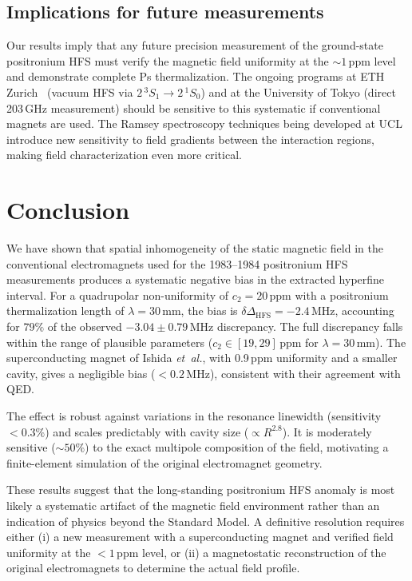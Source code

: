 \documentclass[twocolumn,pra,aps,superscriptaddress,floatfix,10pt]{revtex4-2}
\begin{document}
\subsection{Implications for future measurements}

Our results imply that any future precision measurement of the ground-state positronium HFS must verify the magnetic field uniformity at the $\sim 1$\,ppm level and demonstrate complete Ps thermalization. The ongoing programs at ETH Zurich~\cite{ThorpeWoods2026} (vacuum HFS via $2\,^3S_1 \to 2\,^1S_0$) and at the University of Tokyo (direct 203\,GHz measurement) should be sensitive to this systematic if conventional magnets are used. The Ramsey spectroscopy techniques being developed at UCL~\cite{Newson2026} introduce new sensitivity to field gradients between the interaction regions, making field characterization even more critical.

\section{Conclusion}
\label{sec:conclusion}

We have shown that spatial inhomogeneity of the static magnetic field in the conventional electromagnets used for the 1983--1984 positronium HFS measurements produces a systematic negative bias in the extracted hyperfine interval. For a quadrupolar non-uniformity of $c_2 = 20$\,ppm with a positronium thermalization length of $\lambda = 30$\,mm, the bias is $\delta\Delta_\mathrm{HFS} = -2.4$\,MHz, accounting for $79\%$ of the observed $-3.04 \pm 0.79$\,MHz discrepancy. The full discrepancy falls within the range of plausible parameters ($c_2 \in [19, 29]$\,ppm for $\lambda = 30$\,mm). The superconducting magnet of Ishida \textit{et~al.}, with 0.9\,ppm uniformity and a smaller cavity, gives a negligible bias ($< 0.2$\,MHz), consistent with their agreement with QED.

The effect is robust against variations in the resonance linewidth (sensitivity $< 0.3\%$) and scales predictably with cavity size ($\propto R^{2.8}$). It is moderately sensitive ($\sim 50\%$) to the exact multipole composition of the field, motivating a finite-element simulation of the original electromagnet geometry.

These results suggest that the long-standing positronium HFS anomaly is most likely a systematic artifact of the magnetic field environment rather than an indication of physics beyond the Standard Model. A definitive resolution requires either (i) a new measurement with a superconducting magnet and verified field uniformity at the $< 1$\,ppm level, or (ii) a magnetostatic reconstruction of the original electromagnets to determine the actual field profile.
\end{document}
